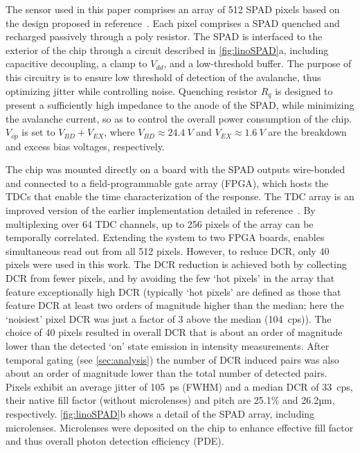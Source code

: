 \documentclass[journal=nalefd, manuscript=letter, layout=twocolumn]{achemso}
\begin{document}
The sensor used in this paper comprises an array of 512 SPAD pixels based on the design proposed in reference\cite{Veerappan2016}~. Each pixel comprises a SPAD quenched and recharged passively through a poly resistor. The SPAD is interfaced to the exterior of the chip through a circuit described in \autoref{fig:linoSPAD}a, including capacitive decoupling, a clamp to $V_{dd}$, and a low-threshold buffer. The purpose of this circuitry is to ensure low threshold of detection of the avalanche, thus optimizing jitter while controlling noise. Quenching resistor $R_q$ is designed to present a sufficiently high impedance to the anode of the SPAD, while minimizing the avalanche current, so as to control the overall power consumption of the chip. $V_{op}$ is set to $V_{BD}+V_{EX}$, where $V_{BD}\approx\SI{24.4}{V}$ and $V_{EX}\approx\SI{1.6}{V}$ are the breakdown and excess bias voltages, respectively.

The chip was mounted directly on a board with the SPAD outputs wire-bonded and connected to a field-programmable gate array (FPGA), which hosts the TDCs that enable the time characterization of the response. The TDC array is an improved version of the earlier implementation detailed in reference\cite{Burri2017}~. By multiplexing over 64 TDC channels, up to 256 pixels of the array can be temporally correlated. Extending the system to two FPGA boards, enables simultaneous read out from all 512 pixels. However, to reduce DCR, only 40 pixels were used in this work. The DCR reduction is achieved both by collecting DCR from fewer pixels, and by avoiding the few `hot pixels' in the array that feature exceptionally high DCR (typically `hot pixels' are defined as those that feature DCR at least two orders of magnitude higher than the median; here the `noisiest' pixel DCR was just a factor of 3 above the median (\SI{104}{cps})). The choice of 40 pixels resulted in overall DCR that is about an order of magnitude lower than the detected `on' state emission in intensity measurements. After temporal gating (see \autoref{sec:analysis}) the number of DCR induced pairs was also about an order of magnitude lower than the total number of detected pairs. Pixels exhibit an average jitter of \SI{105}{ps} (FWHM) and a median DCR of \SI{33}{cps}, their native fill factor (without microlenses) and pitch are 25.1\% and 26.2µm, respectively. \autoref{fig:linoSPAD}b shows a detail of the SPAD array, including microlenses. Microlenses were deposited on the chip to enhance effective fill factor and thus overall photon detection efficiency (PDE).
\end{document}
